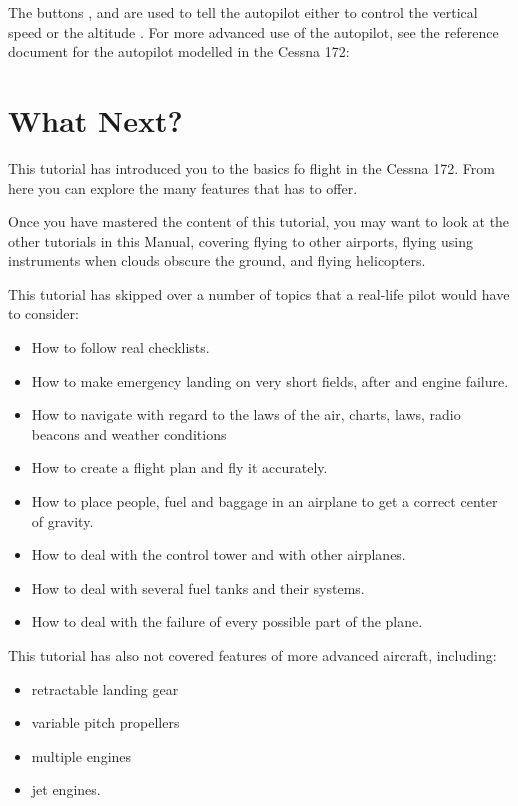 \begin{itemize}
The buttons ,  and  are used to tell
the autopilot either to control the vertical
speed
\textcolor{orange}{} or the altitude
\textcolor{orange}{}.
For more advanced use of the autopilot, see the reference document for the
autopilot modelled in the Cessna 172:
\section{What Next?}
\label{sec:Poslowie}

This tutorial has introduced you to the basics fo flight in the Cessna 172. From
here you can explore the many features that \FlightGear{} has to offer.

Once you have mastered the content of this tutorial, you may want to look at the
other tutorials in this Manual, covering flying to other airports, flying using
instruments when clouds obscure the ground, and flying helicopters.

This tutorial has skipped over a number of topics that a real-life pilot would
have to consider:
\begin{itemize}
    \item How to follow real checklists.
    \item How to make emergency landing on very short fields, after and engine
  failure.
    \item How to navigate with regard to the laws of the air, charts, laws, radio
  beacons and weather conditions
    \item How to create a flight plan and fly it accurately.
    \item How to place people, fuel and baggage in an airplane to get a correct
  center of gravity.
    \item How to deal with the control tower and with other airplanes.
    \item How to deal with several fuel tanks and their systems.
    \item How to deal with the failure of every possible part of the plane.
\end{itemize}

This tutorial has also not covered features of more advanced aircraft,
including:
\begin{itemize}
  \item retractable landing gear
  \item variable pitch propellers
  \item multiple engines
  \item jet engines.
\end{itemize}


\end{itemize}

